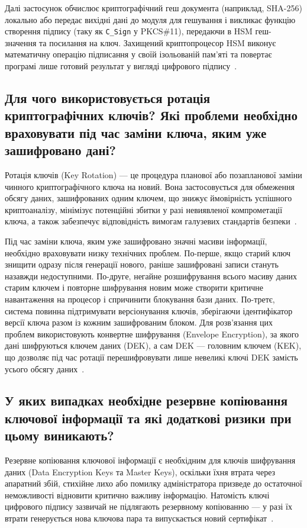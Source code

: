 Далі застосунок обчислює криптографічний геш документа (наприклад, SHA-256) локально або передає
вихідні дані до модуля для гешування і викликає функцію створення підпису (таку як \texttt{C\_Sign} у
PKCS\#11), передаючи в HSM геш-значення та посилання на ключ. Захищений криптопроцесор HSM виконує
математичну операцію підписання у своїй ізольованій пам'яті та повертає програмі лише готовий
результат у вигляді цифрового підпису~\cite{pkcs11, awshsm}.

\subsection{Для чого використовується ротація криптографічних ключів? Які проблеми необхідно враховувати під час заміни ключа, яким уже зашифровано дані?}

Ротація ключів (Key Rotation) --- це процедура планової або позапланової заміни чинного криптографічного
ключа на новий. Вона застосовується для обмеження обсягу даних, зашифрованих одним ключем, що знижує
ймовірність успішного криптоаналізу, мінімізує потенційні збитки у разі невиявленої компрометації
ключа, а також забезпечує відповідність вимогам галузевих стандартів безпеки~\cite{nist57, owaspkey}.

Під час заміни ключа, яким уже зашифровано значні масиви інформації, необхідно враховувати низку
технічних проблем. По-перше, якщо старий ключ знищити одразу після генерації нового, раніше
зашифровані записи стануть назавжди недоступними. По-друге, негайне розшифрування всього масиву даних
старим ключем і повторне шифрування новим може створити критичне навантаження на процесор і
спричинити блокування бази даних. По-третє, система повинна підтримувати версіонування ключів,
зберігаючи ідентифікатор версії ключа разом із кожним зашифрованим блоком. Для розв'язання цих
проблем використовують конвертне шифрування (Envelope Encryption), за якого дані шифруються ключем
даних (DEK), а сам DEK --- головним ключем (KEK), що дозволяє під час ротації перешифровувати лише
невеликі ключі DEK замість усього обсягу даних~\cite{owaspkey, nist57}.

\subsection{У яких випадках необхідне резервне копіювання ключової інформації та які додаткові ризики при цьому виникають?}

Резервне копіювання ключової інформації є необхідним для ключів шифрування даних (Data Encryption Keys
та Master Keys), оскільки їхня втрата через апаратний збій, стихійне лихо або помилку адміністратора
призведе до остаточної неможливості відновити критично важливу інформацію. Натомість ключі цифрового
підпису зазвичай не підлягають резервному копіюванню --- у разі їх втрати генерується нова ключова пара
та випускається новий сертифікат~\cite{nist57, owaspkey}.

